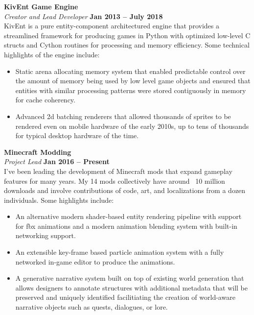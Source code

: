 \documentclass[margin,line]{resume}
\begin{document}
\begin{resume}
\textbf{KivEnt Game Engine} \vspace{2mm}\\\vspace{1mm}%
    \textsl{Creator and Lead Developer} \hfill \textbf{Jan 2013 -- July 2018}\\
KivEnt is a pure entity-component architectured engine that provides a streamlined framework for producing games in Python with optimized low-level C structs and Cython routines for processing and memory efficiency. Some technical highlights of the engine include:
   \begin{itemize}
   \item Static arena allocating memory system that enabled predictable control over the amount of memory being used by low level game objects and ensured that entities with similar processing patterns were stored contiguously in memory for cache coherency.
    \item Advanced 2d batching renderers that allowed thousands of sprites to be rendered even on mobile hardware of the early 2010s, up to tens of thousands for typical desktop hardware of the time. 
   \end{itemize}
\textbf{Minecraft Modding} \vspace{2mm}\\\vspace{1mm}%
    \textsl{Project Lead} \hfill \textbf{Jan 2016 --  Present}\\
I’ve been leading the development of Minecraft mods that expand gameplay features for many years. My 14 mods collectively have around ~10 million downloads and involve contributions of code, art, and localizations from a dozen individuals. Some highlights include:
    \begin{itemize}
	\item An alternative modern shader-based entity rendering pipeline with support for fbx animations and a modern animation blending system with built-in networking support. 
	\item An extensible key-frame based particle animation system with a fully networked in-game editor to produce the animations.
	\item A generative narrative system built on top of existing world generation that allows designers to annotate structures with additional metadata that will be preserved and uniquely identified facilitiating the creation of world-aware narrative objects such as quests, dialogues, or lore.
    \end{itemize}


\end{resume}
\end{document}
